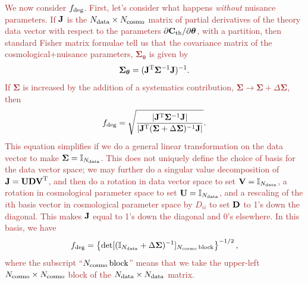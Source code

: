 \documentclass[usenatbib]{mnras}
\newcommand{\changetext}[1]{\textcolor{brown}{#1}}
\begin{document}
\changetext{
We now consider $f_{\rm deg}$. First, let's consider what happens {\em without} nuisance parameters. If ${\bf J}$ is the $N_{\rm data} \times N_{\rm cosmo}$ matrix of partial derivatives of the theory data vector with respect to the parameters $\partial{\bf C}_{\rm th}/\partial{\boldsymbol\theta}$, with a partition, then standard Fisher matrix formulae tell us that the covariance matrix of the cosmological+nuisance parameters, ${\boldsymbol\Sigma}_{\boldsymbol\theta}$ is given by
\begin{equation}
{\boldsymbol\Sigma}_{\boldsymbol\theta} = ({\bf J}^{\rm T}{\boldsymbol\Sigma}^{-1}{\bf J})^{-1}.
\end{equation}
If ${\boldsymbol\Sigma}$ is increased by the addition of a systematics contribution,  ${\boldsymbol\Sigma} \rightarrow {\boldsymbol\Sigma} +\Delta{\boldsymbol\Sigma}$, then 
\begin{equation}
f_{\rm deg} = \sqrt{ \frac{ |{\bf J}^{\rm T}{\boldsymbol\Sigma}^{-1}{\bf J} |}
{| {\bf J}^{\rm T}({\boldsymbol\Sigma}+\Delta{\boldsymbol\Sigma})^{-1}{\bf J} | } }.
\label{eq:fdeg-.5}
\end{equation}
This equation simplifies if we do a general linear transformation on the data vector to make ${\boldsymbol\Sigma} = {\mathbb I}_{N_{\rm data}}$. This does not uniquely define the choice of basis for the data vector space; we may further do a singular value decomposition of ${\bf J} = {\bf UDV}^{\rm T}$, and then do a rotation in data vector space to set ${\bf V} = {\mathbb I}_{N_{\rm data}}$, a rotation in cosmological parameter space to set ${\bf U} = {\mathbb I}_{N_{\rm data}}$, and a rescaling of the $i$th basis vector in cosmological parameter space by $D_{ii}$ to set ${\bf D}$ to 1's down the diagonal. This makes ${\bf J}$ equal to 1's down the diagonal and 0's elsewhere. In this basis, we have
\begin{equation}
f_{\rm deg} = \left\{ \det [({\mathbb I}_{N_{\rm data}} + \Delta{\boldsymbol\Sigma})^{-1}]_{N_{\rm cosmo}\,\rm block} \right\}^{-1/2},
\end{equation}
where the subscript ``$N_{\rm cosmo}\,\rm block$'' means that we take the upper-left $N_{\rm cosmo}\times N_{\rm cosmo}$ block of the $N_{\rm data}\times N_{\rm data}$ matrix.}
\end{document}
